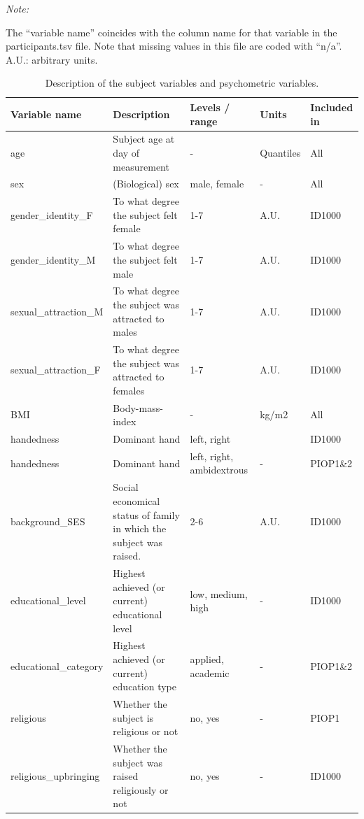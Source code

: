 \documentclass[11pt,american,a4paper,oneside,]{memoir} %
\begin{document}
\begingroup\fontsize{8}{10}\selectfont

\begin{ThreePartTable}
\begin{TableNotes}[para]
\item \textit{Note: } 
\item The “variable name” coincides with the column name for that variable in the participants.tsv file. Note that missing values in this file are coded with “n/a”. A.U.: arbitrary units.
\end{TableNotes}
\begin{longtabu} to 
\caption{\label{tab:tab-aomic-S5}Description of the subject variables and psychometric variables.}\\
\toprule
Variable name & Description & Levels / range & Units & Included in\\
\midrule
age & Subject age at day of measurement & - & Quantiles & All\\
sex & (Biological) sex & male, female & - & All\\
gender\_identity\_F & To what degree the subject felt female & 1-7 & A.U. & ID1000\\
gender\_identity\_M & To what degree the subject felt male & 1-7 & A.U. & ID1000\\
sexual\_attraction\_M & To what degree the subject was attracted to males & 1-7 & A.U. & ID1000\\
\addlinespace
sexual\_attraction\_F & To what degree the subject was attracted to females & 1-7 & A.U. & ID1000\\
BMI & Body-mass-index & - & kg/m2 & All\\
handedness & Dominant hand & left, right &  & ID1000\\
handedness & Dominant hand & left, right, ambidextrous & - & PIOP1\&2\\
background\_SES & Social economical status of family in which the subject was raised. & 2-6 & A.U. & ID1000\\
\addlinespace
educational\_level & Highest achieved (or current) educational level & low, medium, high & - & ID1000\\
educational\_category & Highest achieved (or current) education type & applied, academic & - & PIOP1\&2\\
religious & Whether the subject is religious or not & no, yes & - & PIOP1\\
religious\_upbringing & Whether the subject was raised religiously or not & no, yes & - & ID1000\\

\end{longtabu}
\end{ThreePartTable}
\end{document}
